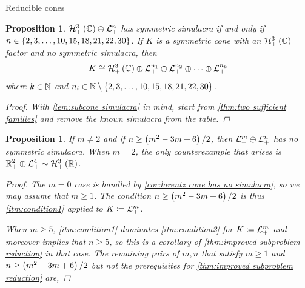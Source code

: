 \documentclass{interact}
\theoremstyle{plain}
\newtheorem{proposition}[theorem]{Proposition}
\theoremstyle{definition}
\theoremstyle{remark}
\begin{document}
\begin{section}{Reducible cones}
    \begin{proposition}\label{prop:simulacra of HC(3)+L(n)}
      $\directsum{\Hnplus[3]\of{\Cn[1]}}{\Lnplus}$ has symmetric
      simulacra if and only if $n \in
      \set{2,3,\ldots,10,15,18,21,22,30}$. If $K$ is a symmetric cone
      with an $\Hnplus[3]\of{\Cn[1]}$ factor and no symmetric
      simulacra, then
      \begin{equation*}
        K
        \cong
        \Hnplus[3]\of{\Cn[1]}
        \oplus
        \Lnplus[n_{1}]
        \oplus
        \Lnplus[n_{2}]
        \oplus
        \cdots
        \oplus
        \Lnplus[n_{k}]
      \end{equation*}
      where $k \in \Nn[1]$ and $n_{i} \in \Nn[1]
      \setminus \set{2,3,\ldots,10,15,18,21,22,30}$.
      \begin{proof}
        With \cref{lem:subcone simulacra} in mind, start from
        \cref{thm:two sufficient families} and remove the known simulacra
        from the table.
      \end{proof}
    \end{proposition}

    \begin{proposition}
      If $m \ne 2$ and if $n \ge \qty{m^2 - 3m + 6}/2$, then
      $\directsum{\Lnplus[m]}{\Lnplus}$ has no symmetric
      simulacra. When $m = 2$, the only counterexample that arises is
      $\directsum{\Rnplus[2]}{\Lnplus[4]} \sim \Hnplus[3]\of{\Rn[1]}$.
      \begin{proof}
        The $m = 0$ case is handled by \cref{cor:lorentz cone has no
          simulacra}, so we may assume that $m \ge 1$. The condition
        $n \ge \qty{m^2 - 3m + 6}/2$ is thus \cref{itm:condition1}
        applied to $K \coloneqq \Lnplus[m]$.

        When $m \ge 5$, \cref{itm:condition1} dominates
        \cref{itm:condition2} for $K \coloneqq \Lnplus[m]$ and
        moreover implies that $n \ge 5$, so this is a corollary of
        \cref{thm:improved subproblem reduction} in that case. The
        remaining pairs of $m,n$ that satisfy $m \ge 1$ and $n \ge
        \qty{m^2 - 3m + 6}/2$ but \emph{not} the prerequisites for
        \cref{thm:improved subproblem reduction} are,


\end{proof}
\end{proposition}
\end{section}
\end{document}

